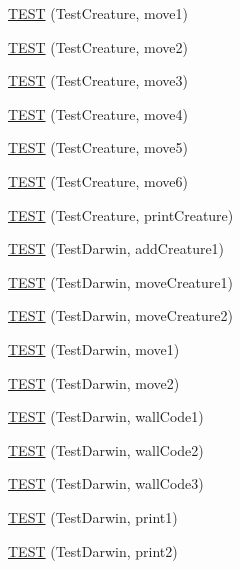 \begin{DoxyCompactItemize}
\item 
\hyperlink{TestDarwin_8c_09_09_ab5a28186677a71e9429ff12942a1c9d7}{T\-E\-S\-T} (Test\-Creature, move1)
\item 
\hyperlink{TestDarwin_8c_09_09_aab86e7c519a901ee3290e594d7ca084a}{T\-E\-S\-T} (Test\-Creature, move2)
\item 
\hyperlink{TestDarwin_8c_09_09_a45240f82acd0efacc6e336f27835c95d}{T\-E\-S\-T} (Test\-Creature, move3)
\item 
\hyperlink{TestDarwin_8c_09_09_afe466a8eab63d7f93021d43b50488dd5}{T\-E\-S\-T} (Test\-Creature, move4)
\item 
\hyperlink{TestDarwin_8c_09_09_a218d1e79e03aa22626c1a459aa318ef0}{T\-E\-S\-T} (Test\-Creature, move5)
\item 
\hyperlink{TestDarwin_8c_09_09_add64bffa1a28ffad3af6f0cdaa5e84c7}{T\-E\-S\-T} (Test\-Creature, move6)
\item 
\hyperlink{TestDarwin_8c_09_09_a3eec985543e5fee88114f7a47858f858}{T\-E\-S\-T} (Test\-Creature, print\-Creature)
\item 
\hyperlink{TestDarwin_8c_09_09_af602033c92a55c809df19943158bb57e}{T\-E\-S\-T} (Test\-Darwin, add\-Creature1)
\item 
\hyperlink{TestDarwin_8c_09_09_aaa0fee612f7a1b8358805ba6fd97c4ba}{T\-E\-S\-T} (Test\-Darwin, move\-Creature1)
\item 
\hyperlink{TestDarwin_8c_09_09_a7b82022e40bcbbd8820674a123614f8b}{T\-E\-S\-T} (Test\-Darwin, move\-Creature2)
\item 
\hyperlink{TestDarwin_8c_09_09_afdec6e44a659030a6c94e3dab2a8ef34}{T\-E\-S\-T} (Test\-Darwin, move1)
\item 
\hyperlink{TestDarwin_8c_09_09_a9e06a7650a9b7b378d4472c35c94c293}{T\-E\-S\-T} (Test\-Darwin, move2)
\item 
\hyperlink{TestDarwin_8c_09_09_a5f7df7ccb3ab533193ddbf8c2e18f820}{T\-E\-S\-T} (Test\-Darwin, wall\-Code1)
\item 
\hyperlink{TestDarwin_8c_09_09_a9013df87aa603471177f2491a7787a98}{T\-E\-S\-T} (Test\-Darwin, wall\-Code2)
\item 
\hyperlink{TestDarwin_8c_09_09_a54141f0ee04d6b36db6b0850b86505e2}{T\-E\-S\-T} (Test\-Darwin, wall\-Code3)
\item 
\hyperlink{TestDarwin_8c_09_09_ada0b88a12ca0d41b6653805e9ab46158}{T\-E\-S\-T} (Test\-Darwin, print1)
\item 
\hyperlink{TestDarwin_8c_09_09_a4f77d22ab1bfc920c166c5c0d49e9415}{T\-E\-S\-T} (Test\-Darwin, print2)
\end{DoxyCompactItemize}
